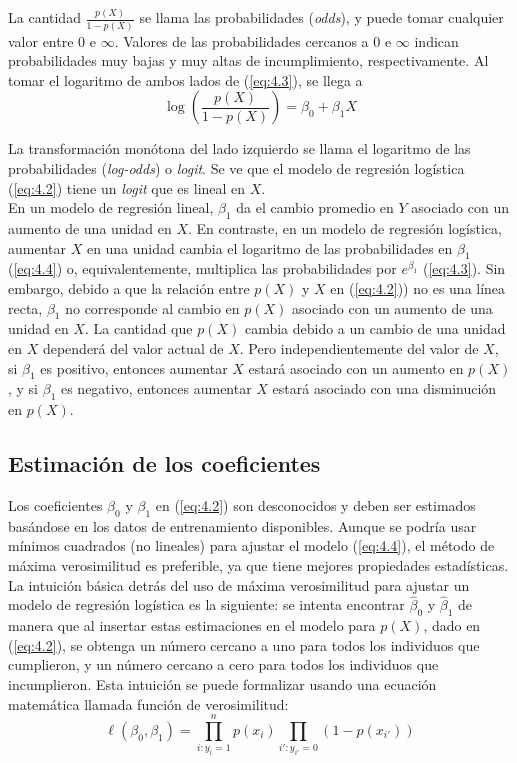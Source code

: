 La cantidad $\frac{p(X)}{1 - p(X)}$ se llama las probabilidades (\textit{odds}), y puede tomar cualquier valor entre 0 e $\infty$. Valores de las probabilidades cercanos a 0 e $\infty$ indican probabilidades muy bajas y muy altas de incumplimiento, respectivamente. Al tomar el logaritmo de ambos lados de (\ref{eq:4.3}), se llega a
\begin{equation}
\log\left(\frac{p(X)}{1 - p(X)}\right) = \beta_0 + \beta_1 X
\label{eq:4.4}
\end{equation}

La transformación monótona del lado izquierdo se llama el logaritmo de las probabilidades (\textit{log-odds}) o \textit{logit}. Se ve que el modelo de regresión logística (\ref{eq:4.2}) tiene un \textit{logit} que es lineal en $X$. \\

En un modelo de regresión lineal, $\beta_1$ da el cambio promedio en $Y$ asociado con un aumento de una unidad en $X$. En contraste, en un modelo de regresión logística, aumentar $X$ en una unidad cambia el logaritmo de las probabilidades en $\beta_1$ (\ref{eq:4.4}) o, equivalentemente, multiplica las probabilidades por $e^{\beta_1}$ (\ref{eq:4.3}). Sin embargo, debido a que la relación entre $p(X)$ y $X$ en (\ref{eq:4.2})) no es una línea recta, $\beta_1$ no corresponde al cambio en $p(X)$ asociado con un aumento de una unidad en $X$. La cantidad que $p(X)$ cambia debido a un cambio de una unidad en $X$ dependerá del valor actual de $X$. Pero independientemente del valor de $X$, si $\beta_1$ es positivo, entonces aumentar $X$ estará asociado con un aumento en $p(X)$, y si $\beta_1$ es negativo, entonces aumentar $X$ estará asociado con una disminución en $p(X)$.

\subsection{Estimación de los coeficientes}

Los coeficientes $\beta_0$ y $\beta_1$ en (\ref{eq:4.2}) son desconocidos y deben ser estimados basándose en los datos de entrenamiento disponibles. Aunque se podría usar mínimos cuadrados (no lineales) para ajustar el modelo (\ref{eq:4.4}), el método de máxima verosimilitud es preferible, ya que tiene mejores propiedades estadísticas. La intuición básica detrás del uso de máxima verosimilitud para ajustar un modelo de regresión logística es la siguiente: se intenta encontrar $\hat{\beta}_0$ y $\hat{\beta}_1$ de manera que al insertar estas estimaciones en el modelo para $p(X)$, dado en (\ref{eq:4.2}), se obtenga un número cercano a uno para todos los individuos que cumplieron, y un número cercano a cero para todos los individuos que incumplieron. Esta intuición se puede formalizar usando una ecuación matemática llamada función de verosimilitud:
\begin{equation}
\ell(\beta_0, \beta_1) = \prod_{i:y_i=1}^n p(x_i) \prod_{i':y_{i'} = 0} (1 - p(x_{i'}))
\label{eq:4.5}
\end{equation}

